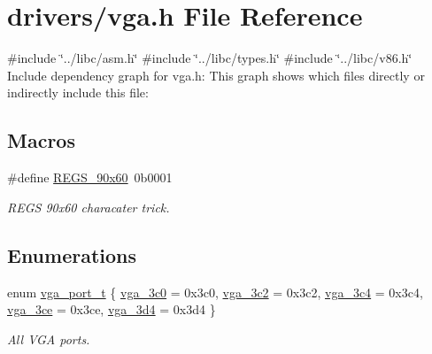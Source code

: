 \hypertarget{a00008}{}\section{drivers/vga.h File Reference}
\label{a00008}
{\ttfamily \#include \char`\"{}../libc/asm.\+h\char`\"{}}\newline
{\ttfamily \#include \char`\"{}../libc/types.\+h\char`\"{}}\newline
{\ttfamily \#include \char`\"{}../libc/v86.\+h\char`\"{}}\newline
Include dependency graph for vga.\+h\+:
This graph shows which files directly or indirectly include this file\+:
\subsection*{Macros}
\begin{DoxyCompactItemize}
\item 
\#define \hyperlink{a00008_a34fb560ebb3467ef63fc70ae48a3cfbc_a34fb560ebb3467ef63fc70ae48a3cfbc}{R\+E\+G\+S\+\_\+90x60}~0b0001
\begin{DoxyCompactList}\small\item\em R\+E\+GS 90x60 characater trick. \end{DoxyCompactList}\end{DoxyCompactItemize}
\subsection*{Enumerations}
\begin{DoxyCompactItemize}
\item 
enum \hyperlink{a00008_a63bf0a876af36076ffb713ff00618ce4_a63bf0a876af36076ffb713ff00618ce4}{vga\+\_\+port\+\_\+t} \{ \newline
\hyperlink{a00008_a63bf0a876af36076ffb713ff00618ce4_a63bf0a876af36076ffb713ff00618ce4a03f85695a2893f604d3eabc0afff0c75}{vga\+\_\+3c0} = 0x3c0, 
\hyperlink{a00008_a63bf0a876af36076ffb713ff00618ce4_a63bf0a876af36076ffb713ff00618ce4a0ebf5e2c74cf875bb40458e6c625d334}{vga\+\_\+3c2} = 0x3c2, 
\hyperlink{a00008_a63bf0a876af36076ffb713ff00618ce4_a63bf0a876af36076ffb713ff00618ce4ab5776e9276da3ab0cc4f5626315cc7f5}{vga\+\_\+3c4} = 0x3c4, 
\hyperlink{a00008_a63bf0a876af36076ffb713ff00618ce4_a63bf0a876af36076ffb713ff00618ce4a575d57b78ca24405f26d1a13eb9e163d}{vga\+\_\+3ce} = 0x3ce, 
\newline
\hyperlink{a00008_a63bf0a876af36076ffb713ff00618ce4_a63bf0a876af36076ffb713ff00618ce4a4e0b7249521c5b0085d99124dd91fc9c}{vga\+\_\+3d4} = 0x3d4
 \}\begin{DoxyCompactList}\small\item\em All V\+GA ports. \end{DoxyCompactList}
\end{DoxyCompactItemize}
